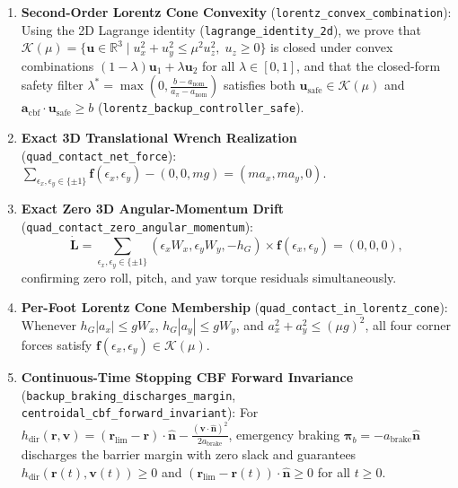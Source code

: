 \documentclass[10pt,twocolumn]{article}
\theoremstyle{definition}
\begin{document}
\begin{enumerate}[leftmargin=1.4em,itemsep=1pt]
  \item \textbf{Second-Order Lorentz Cone Convexity} (\texttt{lorentz\_convex\_combination}): Using the 2D Lagrange identity (\texttt{lagrange\_identity\_2d}), we prove that $\mathcal{K}(\mu) = \{\mathbf{u} \in \mathbb{R}^3 \mid u_x^2 + u_y^2 \le \mu^2 u_z^2,\; u_z \ge 0\}$ is closed under convex combinations $(1-\lambda)\mathbf{u}_1 + \lambda\mathbf{u}_2$ for all $\lambda \in [0, 1]$, and that the closed-form safety filter $\lambda^* = \max(0, \frac{b - a_{\text{nom}}}{a_\pi - a_{\text{nom}}})$ satisfies both $\mathbf{u}_{\text{safe}} \in \mathcal{K}(\mu)$ and $\mathbf{a}_{\text{cbf}}\cdot\mathbf{u}_{\text{safe}} \ge b$ (\texttt{lorentz\_backup\_controller\_safe}).
  \item \textbf{Exact 3D Translational Wrench Realization} (\texttt{quad\_contact\_net\_force}): $\sum_{\epsilon_x, \epsilon_y \in \{\pm 1\}} \mathbf{f}(\epsilon_x, \epsilon_y) - (0, 0, mg) = (m a_x, m a_y, 0)$.
  \item \textbf{Exact Zero 3D Angular-Momentum Drift} (\texttt{quad\_contact\_zero\_angular\_momentum}):
  \begin{equation}
    \dot{\mathbf{L}} = \sum_{\epsilon_x, \epsilon_y \in \{\pm 1\}} (\epsilon_x W_x, \epsilon_y W_y, -h_G) \times \mathbf{f}(\epsilon_x, \epsilon_y) = (0, 0, 0),
  \end{equation}
  confirming zero roll, pitch, and yaw torque residuals simultaneously.
  \item \textbf{Per-Foot Lorentz Cone Membership} (\texttt{quad\_contact\_in\_lorentz\_cone}): Whenever $h_G|a_x| \le g W_x$, $h_G|a_y| \le g W_y$, and $a_x^2 + a_y^2 \le (\mu g)^2$, all four corner forces satisfy $\mathbf{f}(\epsilon_x, \epsilon_y) \in \mathcal{K}(\mu)$.
  \item \textbf{Continuous-Time Stopping CBF Forward Invariance} (\texttt{backup\_braking\_discharges\_margin}, \texttt{centroidal\_cbf\_forward\_invariant}): For $h_{\text{dir}}(\mathbf{r}, \mathbf{v}) = (\mathbf{r}_{\text{lim}} - \mathbf{r})\cdot\hat{\mathbf{n}} - \frac{(\mathbf{v}\cdot\hat{\mathbf{n}})^2}{2 a_{\text{brake}}}$, emergency braking $\boldsymbol{\pi}_b = -a_{\text{brake}}\hat{\mathbf{n}}$ discharges the barrier margin with zero slack and guarantees $h_{\text{dir}}(\mathbf{r}(t), \mathbf{v}(t)) \ge 0$ and $(\mathbf{r}_{\text{lim}} - \mathbf{r}(t))\cdot\hat{\mathbf{n}} \ge 0$ for all $t \ge 0$.
\end{enumerate}
\end{document}
